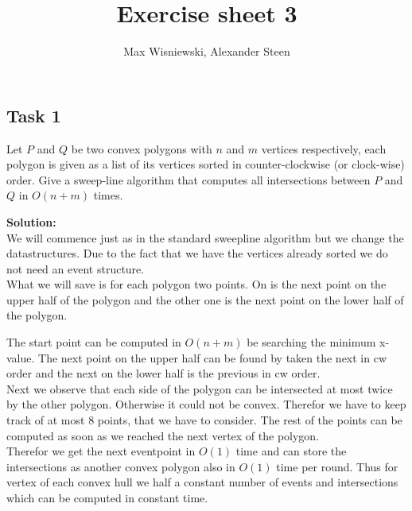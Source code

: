 \documentclass[11pt,a4paper,ngerman]{article}
\date{}
\title{Exercise sheet 3}
\author{Max Wisniewski, Alexander Steen}
\begin{document}

\renewcommand{\figurename}{Figure}

\maketitle
\thispagestyle{fancy}

\subsection*{Task 1}

Let $P$ and $Q$ be two convex polygons with $n$ and $m$ vertices respectively, each polygon is given as
a list of its vertices sorted in counter-clockwise (or clock-wise) order. Give a sweep-line algorithm
that computes all intersections between $P$ and $Q$ in $O(n + m)$ times.

\textbf{Solution:}\\

We will commence just as in the standard sweepline algorithm but we change the datastructures. Due to the fact
that we have the vertices already sorted we do not need an event structure.\\
What we will save is for each polygon two points. On is the next point on the upper half of the polygon
and the other one is the next point on the lower half of the polygon.

The start point can be computed in $O(n + m)$ be searching the minimum x-value. The next point on the upper half
can be found by taken the next in cw order and the next on the lower half is the previous in cw order.\\

Next we observe that each side of the polygon can be intersected at most twice by the other polygon. Otherwise
it could not be convex. Therefor we have to keep track of at most 8 points, that we have to consider. The rest of
the points can be computed as soon as we reached the next vertex of the polygon.\\

Therefor we get the next eventpoint in $O(1)$ time and can store the intersections as another convex polygon also in $O(1)$ time
per round. Thus for vertex of each convex hull we half a constant number of events and intersections which can be computed in constant time.\\
\end{document}
